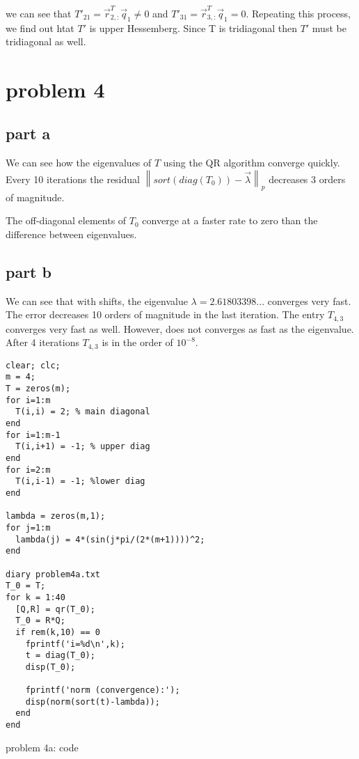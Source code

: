\documentclass[10pt]{article}
\newcommand{\norm}[1]{\left\lVert#1\right\rVert_p}
\begin{document}
we can see that $T'_{21} = \vec{r}_{2,:}^T \vec{q}_1 \neq 0$ and $T'_{31} = \vec{r}_{3,:}^T \vec{q}_1 =0$. 
Repeating this process, we find out htat $T'$ is upper Hessemberg. Since T is tridiagonal then
$T'$ must be tridiagonal as well. 

\section{problem 4}

\subsection{part a}
We can see how the eigenvalues of $T$ using the QR algorithm converge quickly. Every 
10 iterations the residual $\norm{sort(diag(T_0)) -\vec{\lambda}}$ decreases 3 orders
of magnitude.

The off-diagonal elements of $T_0$ converge at a faster rate to zero than the difference
between eigenvalues.
 
\subsection{part b}
We can see that with shifts, the eigenvalue $\lambda=2.61803398...$ converges very fast. The
error decreases 10 orders of magnitude in the last iteration. The entry $T_{4,3}$ converges
very fast as well. However, does not converges as fast as the eigenvalue. After 4 iterations
$T_{4,3}$ is in the order of $10^{-8}$. 


\begin{program}
 \begin{verbatim}
clear; clc;
m = 4;
T = zeros(m);
for i=1:m
  T(i,i) = 2; % main diagonal
end
for i=1:m-1
  T(i,i+1) = -1; % upper diag
end
for i=2:m
  T(i,i-1) = -1; %lower diag
end

lambda = zeros(m,1);
for j=1:m
  lambda(j) = 4*(sin(j*pi/(2*(m+1))))^2;
end

diary problem4a.txt
T_0 = T;
for k = 1:40
  [Q,R] = qr(T_0);
  T_0 = R*Q;
  if rem(k,10) == 0
    fprintf('i=%d\n',k);
    t = diag(T_0);
    disp(T_0);
    
    fprintf('norm (convergence):');
    disp(norm(sort(t)-lambda)); 
  end
end
  \end{verbatim}
\caption{problem 4a: code}
\end{program}
\end{document}
